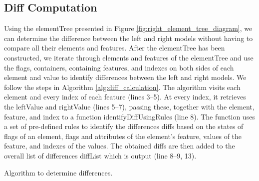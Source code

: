 \subsection{Diff Computation}
\label{sec:diff_computation}
Using the \textsf{elementTree} presented in Figure \ref{fig:right_element_tree_diagram}, we can determine the difference between the left and right models without having to compare all their elements and features. After the \textsf{elementTree} has been constructed, we iterate through elements and features of the \textsf{elementTree} and use the flags, containers, containing features, and indexes on both sides of each element and value to identify differences between the left and right models. We follow the steps in Algorithm \ref{alg:diff_calculation}. The algorithm visits each element and every index of each feature (lines 3–5). At every index, it retrieves the \textsf{leftValue} and \textsf{rightValue} (lines 5–7), passing these, together with the \textsf{element}, \textsf{feature}, and \textsf{index} to a function \textsf{identifyDiffUsingRules} (line 8). The function uses a set of pre-defined rules to identify the differences \textsf{diffs} based on the states of flags of an element, flags and attributes of the element’s feature, values of the feature, and indexes of the values. The obtained \textsf{diffs} are then added to the overall list of differences \textsf{diffList} which is output (line 8–9, 13).

\IncMargin{1.5em}
\begin{algorithm}[H]
  \begin{footnotesize}
  \end{footnotesize}
  \caption{Algorithm to determine differences.}
  \label{alg:diff_calculation}
\end{algorithm}
\DecMargin{1.5em}

